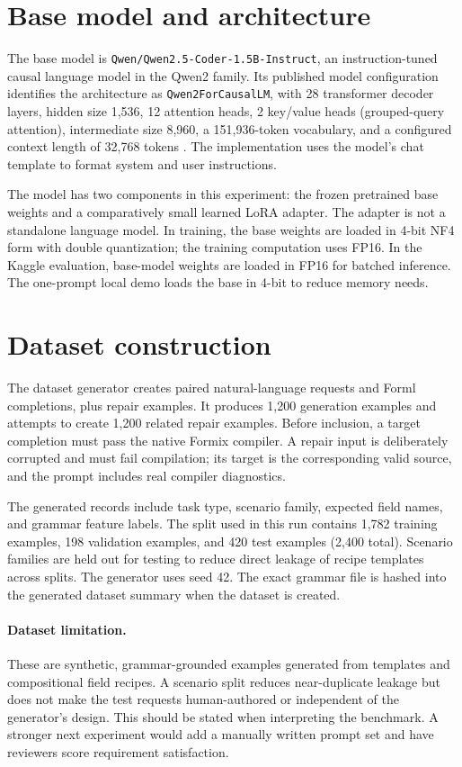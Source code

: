 \documentclass[11pt,a4paper]{article}
\begin{document}
\section{Base model and architecture}
The base model is \texttt{Qwen/Qwen2.5-Coder-1.5B-Instruct}, an instruction-tuned causal language model in the Qwen2 family. Its published model configuration identifies the architecture as \texttt{Qwen2ForCausalLM}, with 28 transformer decoder layers, hidden size 1,536, 12 attention heads, 2 key/value heads (grouped-query attention), intermediate size 8,960, a 151,936-token vocabulary, and a configured context length of 32,768 tokens \cite{qwenconfig}. The implementation uses the model's chat template to format system and user instructions.

The model has two components in this experiment: the frozen pretrained base weights and a comparatively small learned LoRA adapter. The adapter is not a standalone language model. In training, the base weights are loaded in 4-bit NF4 form with double quantization; the training computation uses FP16. In the Kaggle evaluation, base-model weights are loaded in FP16 for batched inference. The one-prompt local demo loads the base in 4-bit to reduce memory needs.

\section{Dataset construction}
The dataset generator creates paired natural-language requests and Forml completions, plus repair examples. It produces 1,200 generation examples and attempts to create 1,200 related repair examples. Before inclusion, a target completion must pass the native Formix compiler. A repair input is deliberately corrupted and must fail compilation; its target is the corresponding valid source, and the prompt includes real compiler diagnostics.

The generated records include task type, scenario family, expected field names, and grammar feature labels. The split used in this run contains 1,782 training examples, 198 validation examples, and 420 test examples (2,400 total). Scenario families are held out for testing to reduce direct leakage of recipe templates across splits. The generator uses seed 42. The exact grammar file is hashed into the generated dataset summary when the dataset is created.

\paragraph{Dataset limitation.} These are synthetic, grammar-grounded examples generated from templates and compositional field recipes. A scenario split reduces near-duplicate leakage but does not make the test requests human-authored or independent of the generator's design. This should be stated when interpreting the benchmark. A stronger next experiment would add a manually written prompt set and have reviewers score requirement satisfaction.
\end{document}
